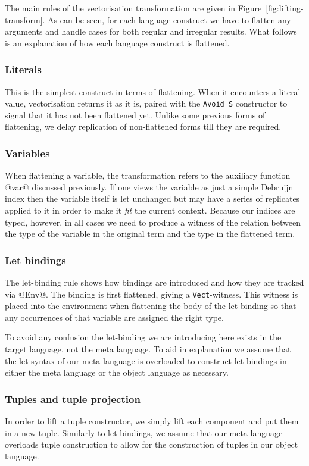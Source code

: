 The main rules of the vectorisation transformation are given in Figure~\ref{fig:lifting-transform}. As can be seen, for each language construct we have to flatten any arguments and handle cases for both regular and irregular results. What follows is an explanation of how each language construct is flattened.

\subsubsection{Literals}
This is the simplest construct in terms of flattening. When it encounters a literal value, vectorisation returns it as it is, paired with the \lstinline[style=ndp]{Avoid_S} constructor to signal that it has not been flattened yet. Unlike some previous forms of flattening, we delay replication of non-flattened forms till they are required.

\subsubsection{Variables }
When flattening a variable, the transformation refers to the auxiliary function @var@ discussed previously. If one views the variable as just a simple Debruijn index then the variable itself is let unchanged but may have a series of replicates applied to it in order to make it \emph{fit} the current context. Because our indices are typed, however, in all cases we need to produce a witness of the relation between the type of the variable in the original term and the type in the flattened term.

\subsubsection{Let bindings}
The let-binding rule shows how bindings are introduced and how they are tracked via @Env@. The binding is first flattened, giving a \lstinline[style=ndp]{Vect}-witness. This witness is placed into the environment when flattening the body of the let-binding so that any occurrences of that variable are assigned the right type.

To avoid any confusion the let-binding we are introducing here exists in the target language, not the meta language. To aid in explanation we assume that the let-syntax of our meta language is overloaded to construct let bindings in either the meta language or the object language as necessary.

\subsubsection{Tuples and tuple projection}
In order to lift a tuple constructor, we simply lift each component and put them in a new tuple. Similarly to let bindings, we assume that our meta language overloads tuple construction to allow for the construction of tuples in our object language.

